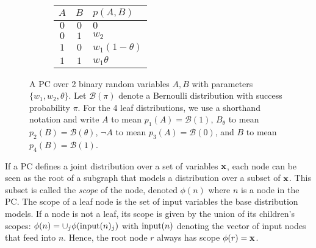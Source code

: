 \begin{figure*}[ht!]
    \begin{subfigure}[t]{0.6\textwidth}
        \centering
        
    \end{subfigure}
    ~
    \begin{subfigure}[t]{0.4\textwidth}
        \vspace{-3.2cm}
        \begin{tabular}{cc|l}
           $A$ & $B$ & $p(A, B)$ \\
           \hline
           $0$ & $0$ & $0$ \\
           $0$ & $1$ & $w_2$ \\
           $1$ & $0$ & $w_1 (1 - \theta)$ \\
           $1$ & $1$ & $w_1 \theta$
        \end{tabular}
    \end{subfigure}
    \caption{A PC over 2 binary random variables $A, B$ with parameters $\{w_1, w_2, \theta\}$. Let $\mathcal{B}(\pi)$ denote a Bernoulli distribution with success probability $\pi$. For the 4 leaf distributions, we use a shorthand notation and write $A$ to mean $p_1(A) = \mathcal{B}(1)$, $B_\theta$ to mean $p_2(B) = \mathcal{B}(\theta)$, $\neg A$ to mean $p_3(A) = \mathcal{B}(0)$, and $B$ to mean $p_4(B) = \mathcal{B}(1)$.}
    \label{fig:example_pc}
\end{figure*}

\begin{definition}[Scope]
If a PC defines a joint distribution over a set of variables $\mathbf{x}$, each node can be seen as the root of a subgraph that models a distribution over a subset of $\mathbf{x}$. This subset is called the \textit{scope} of the node, denoted $\phi(n)$ where $n$ is a node in the PC. The scope of a leaf node is the set of input variables the base distribution models. If a node is not a leaf, its scope is given by the union of its children's scopes: $\phi(n) = \cup_j \phi(\operatorname{input}(n)_j)$ with $\operatorname{input}(n)$ denoting the vector of input nodes that feed into $n$. Hence, the root node $r$ always has scope $\phi(r) = \mathbf{x}$. 
\end{definition}

